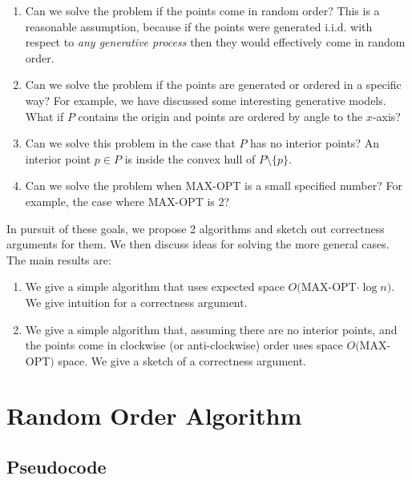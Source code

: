 \documentclass[12pt]{article}
\theoremstyle{definition}
\begin{document}
\begin{enumerate}
\item Can we solve the problem if the points come in random order? This is a reasonable assumption, because if the points were generated i.i.d. with respect to \emph{any generative process} then they would effectively come in random order.

\item Can we solve the problem if the points are generated or ordered in a specific way? For example, we have discussed some interesting generative models. What if $P$ contains the origin and points are ordered by angle to the $x$-axis?

\item Can we solve this problem in the case that $P$ has no interior points? An interior point $p \in P$ is inside the convex hull of $P \setminus \{p\}$.

\item Can we solve the problem when MAX-OPT is a small specified number? For example, the case where MAX-OPT is 2?

\end{enumerate}

In pursuit of these goals, we propose 2 algorithms and sketch out correctness arguments for them. We then discuss ideas for solving the more general cases. The main results are:

\begin{enumerate}

\item We give a simple algorithm that uses expected space $O($MAX-OPT$\cdot \log{n})$. We give intuition for a correctness argument.

\item We give a simple algorithm that, assuming there are no interior points, and the points come in clockwise (or anti-clockwise) order uses space $O($MAX-OPT$)$ space. We give a sketch of a correctness argument.

\end{enumerate}

\section{Random Order Algorithm}

\subsection{Pseudocode}
\end{document}
